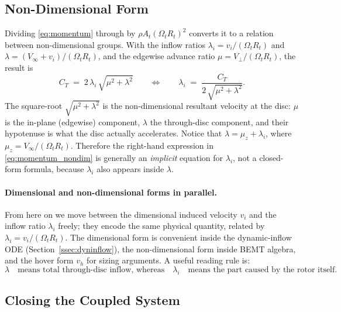\documentclass[11pt,a4paper]{article}
\newcommand{\OmegaT}{\Omega_t}
\newcommand{\Rt}{R_t}
\newcommand{\At}{A_t}
\newcommand{\vi}{v_i}
\begin{document}
\subsection{Non-Dimensional Form}\label{ssec:inflow_nondim}

Dividing \eqref{eq:momentum} through by \(\rho\At(\OmegaT\Rt)^2\) converts
it to a relation between non-dimensional groups. With the inflow ratios
\(\lambda_i = \vi/(\OmegaT\Rt)\) and \(\lambda = (V_\infty+\vi)/(\OmegaT\Rt)\),
and the edgewise advance ratio \(\mu = V_\perp/(\OmegaT\Rt)\), the result is
\begin{equation}
C_T \;=\; 2\,\lambda_i\,\sqrt{\mu^2 + \lambda^2}
\qquad\Longleftrightarrow\qquad
\lambda_i \;=\; \frac{C_T}{2\,\sqrt{\mu^2 + \lambda^2}}.
\label{eq:momentum_nondim}
\end{equation}
The square-root \(\sqrt{\mu^2+\lambda^2}\) is the non-dimensional
resultant velocity at the disc: \(\mu\) is the in-plane (edgewise)
component, \(\lambda\) the through-disc component, and their hypotenuse
is what the disc actually accelerates. Notice that
\(\lambda=\mu_z+\lambda_i\), where
\(\mu_z=V_\infty/(\OmegaT\Rt)\). Therefore the right-hand expression in
\eqref{eq:momentum_nondim} is generally an \emph{implicit} equation for
\(\lambda_i\), not a closed-form formula, because \(\lambda_i\) also
appears inside \(\lambda\).

\paragraph{Dimensional and non-dimensional forms in parallel.}
From here on we move between the dimensional induced velocity \(\vi\)
and the inflow ratio \(\lambda_i\) freely; they encode the same
physical quantity, related by
\(\lambda_i = \vi/(\OmegaT\Rt)\). The dimensional form is convenient
inside the dynamic-inflow ODE (Section~\ref{ssec:dyninflow}), the
non-dimensional form inside BEMT algebra, and the hover form \(v_h\) for
sizing arguments. A useful reading rule is:
\[
\lambda \quad\text{means total through-disc inflow, whereas}\quad
\lambda_i \quad\text{means the part caused by the rotor itself.}
\]

\subsection{Closing the Coupled System}\label{ssec:closing_coupled_system}
\end{document}
